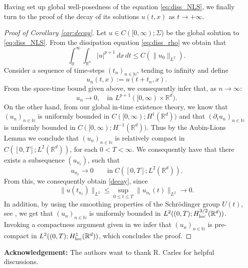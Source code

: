 \documentclass[a4paper,leqno]{amsart}
\theoremstyle{plain}
\theoremstyle{definition}
\numberwithin{equation}{section}
\begin{document}
Having set up global well-posedness of the equation \ref{eq:diss_NLS}, we finally
turn to the proof of the decay of its solutions $u(t,x)$ as $t\to + \infty$.

\begin{proof}[Proof of Corollary \ref{cor:decay}]
Let $u\in C([0, \infty); \Sigma)$ be the global solution to \eqref{eq:diss_NLS}. From the
dissipation equation \eqref{eq:diss_rho} we obtain that
\begin{equation*}
\int_0^\infty\int_{{{\mathbb R}}^n}|u|^{p+1}\,dx\,dt{\leqslant} C(\|u_0\|_{L^2}).
\end{equation*}
Consider a sequence of time-steps $(t_n)_{n\in {{\mathbb N}}}$, tending to infinity and define
\begin{equation*}
u_n(t, x):=u(t+t_n, x).
\end{equation*}
From the space-time bound given above, we consequently infer that, as $n \to \infty$:
$$u_n\to0, \quad  \text{in $L^{p+1}([0, \infty)\times{{\mathbb R}}^d)$}.
$$
On the other hand, from our global in-time existence theory, we know that $(u_n)_{n \in {{\mathbb N}}}$ is uniformly bounded in
$ C([0, \infty); H^1({{\mathbb R}}^d))$ and that $({\partial}_tu_n)_{n \in {{\mathbb N}}}$ is uniformly bounded in $C([0, \infty); H^{-1}({{\mathbb R}}^d))$.
Thus by the Aubin-Lions Lemma we conclude that $(u_n)_{n \in {{\mathbb N}}}$ is relatively compact in $C([0, T]; L^2({{\mathbb R}}^d))$, for each $0<T<\infty$.
We consequently have that there exists a subsequence $(u_{n_\ell})$, such that
\begin{equation*}
u_{n_\ell}\to0\qquad\textrm{in}\; C([0, T]; L^2({{\mathbb R}}^d)).
\end{equation*}
From this, we consequently obtain \eqref{decay}, since
\begin{equation*}
\|u(t_{n_\ell})\|_{L^2}{\leqslant}\sup_{0{\leqslant} t{\leqslant} T}\|u_{n_\ell}(t)\|_{L^2}\to0.
\end{equation*}
In addition, by using the smoothing properties of the Schr\"odinger group $U(t)$, see \cite{CoSa}, we 
get that $(u_n)_{n \in {{\mathbb N}}}$ is uniformly bounded in $L^2((0,T); H^{3/2}_{\rm loc}({{\mathbb R}}^d))$.
Invoking a compactness argument given in \cite{RaTe} we infer that $(u_n)_{n \in {{\mathbb N}}}$ is pre-compact in $L^2((0,T); H^{1}_{\rm loc}({{\mathbb R}}^d))$, 
which concludes the proof. 
\end{proof}

{\bf Acknowledgement:} The authors want to thank R. Carles for helpful discussions.
\end{document}
